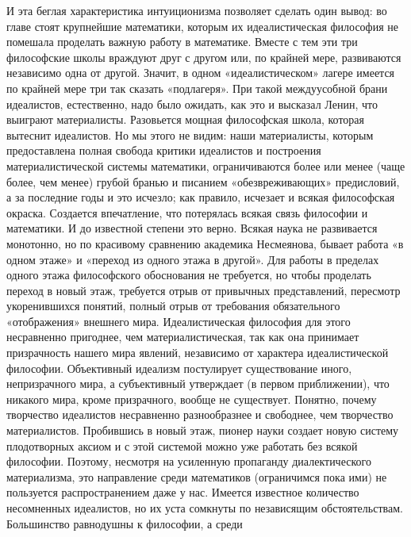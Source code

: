 И   эта   беглая   характеристика  интуиционизма   позволяет   сделать
один  вывод:   во  главе  стоят  крупнейшие   математики,  которым  их
идеалистическая  философия  не  помешала  проделать  важную  работу  в
математике.  Вместе с  тем  эти три  философские  школы враждуют  друг
с  другом  или,  по  крайней  мере,  развиваются  независимо  одна  от
другой. Значит,  в одном  «идеалистическом» лагере имеется  по крайней
мере  три  так  сказать  «подлагеря».  При  такой  междуусобной  брани
идеалистов,  естественно,  надо  было  ожидать,  как  это  и  высказал
Ленин,  что  выиграют   материалисты.  Разовьется  мощная  философская
школа,  которая  вытеснит  идеалистов.  Но мы  этого  не  видим:  наши
материалисты, которым предоставлена  полная свобода критики идеалистов
и  построения  материалистической системы  математики,  ограничиваются
более  или менее  (чаще более,  чем  менее) грубой  бранью и  писанием
«обезвреживающих»  предисловий, а  за  последние годы  и это  исчезло;
как  правило,   исчезает  и  всякая  философская   окраска.  Создается
впечатление, что потерялась всякая связь  философии и математики. И до
известной степени  это верно.  Всякая наука не  развивается монотонно,
но  по  красивому сравнению  академика  Несмеянова,  бывает работа  «в
одном  этаже» и  «переход  из одного  этажа в  другой».  Для работы  в
пределах  одного  этажа  философского  обоснования  не  требуется,  но
чтобы проделать  переход в  новый этаж,  требуется отрыв  от привычных
представлений,  пересмотр  укоренившихся   понятий,  полный  отрыв  от
требования обязательного «отображения»  внешнего мира. Идеалистическая
философия для этого несравненно пригоднее, чем материалистическая, так
как  она принимает  призрачность  нашего мира  явлений, независимо  от
характера идеалистической философии.  Объективный идеализм постулирует
существование иного, непризрачного мира,  а субъективный утверждает (в
первом  приближении), что  никакого  мира,  кроме призрачного,  вообще
не  существует.  Понятно,  почему  творчество  идеалистов  несравненно
разнообразнее  и свободнее,  чем творчество  материалистов. Пробившись
в  новый  этаж,  пионер   науки  создает  новую  систему  плодотворных
аксиом   и   с  этой   системой   можно   уже  работать   без   всякой
философии. Поэтому,  несмотря на усиленную  пропаганду диалектического
материализма,  это  направление  среди математиков  (ограничимся  пока
ими)  не пользуется  распространением  даже у  нас. Имеется  известное
количество несомненных идеалистов, но  их уста сомкнуты по независящим
обстоятельствам.   Большинство  равнодушны   к   философии,  а   среди
